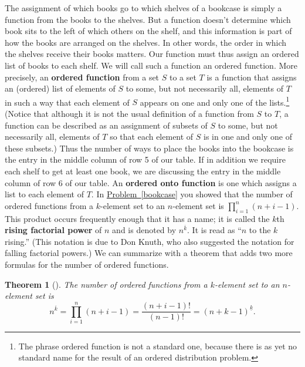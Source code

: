 \documentclass[10pt,]{book}
\newcommand{\terminology}[1]{\textbf{#1}}
\theoremstyle{plain}
\newtheorem{theorem}{Theorem}[section]
\theoremstyle{definition}
\theoremstyle{definition}
\numberwithin{equation}{chapter}
\begin{document}
The assignment of which books go to which shelves of a bookcase is simply a function from the books to the shelves. But a function doesn't determine which book sits to the left of which others on the shelf, and this information is part of how the books are arranged on the shelves. In other words, the order in which the shelves receive their books matters.  Our function must thus assign an ordered list of books to each shelf. We will call such a function an ordered function. More precisely, an \terminology{ordered function} from a set \(S\) to a set \(T\) is a function that assigns an (ordered) list of elements of \(S\) to some, but not necessarily all, elements of \(T\) in such a way that each element of \(S\) appears on one and only one of the lists.\footnote{The phrase ordered function is not a standard one, because there is as yet no standard name for the result of an ordered distribution problem.\label{fn-6}} (Notice that although it is not the usual definition of a function from \(S\) to \(T\), a function can be described as an assignment of subsets of \(S\) to some, but not necessarily all, elements of \(T\) so that each element of \(S\) is in one and only one of these subsets.) Thus the number of ways to place the books into the bookcase is the entry in the middle column of row 5 of our table. If in addition we require each shelf to get at least one book, we are discussing the entry in the middle column of row 6 of our table. An \terminology{ordered onto function} is one which assigns a list to each element of \(T\). In \hyperref[bookcase]{Problem~\ref{bookcase}} you showed that the number of ordered functions from a \(k\)-element set to an \(n\)-element set is \(\displaystyle \prod_{i=1}^n (n+i-1)\). This product occurs frequently enough that it has a name; it is called the \(k\)\/th \terminology{rising factorial power} of \(n\) and is denoted by \(n^{\overline{k}}\).  It is read as ``\(n\) to the \(k\) rising.'' (This notation is due to Don Knuth, who also suggested the notation for falling factorial powers.) We can summarize with a theorem that adds two more formulas for the number of ordered functions.%
\begin{theorem}[{}]\label{theorem-6}
The number of ordered functions from a \(k\)-element set to an \(n\)-element set is%
\begin{equation*}
n^{\overline{k}}=\prod_{i=1}^n (n+i-1) = \frac{(n+i-1)!}{(n-1)!} =
(n+k-1)^{\underline{k}}.
\end{equation*}
%
\end{theorem}
\typeout{************************************************}
\typeout{************************************************}
\end{document}
